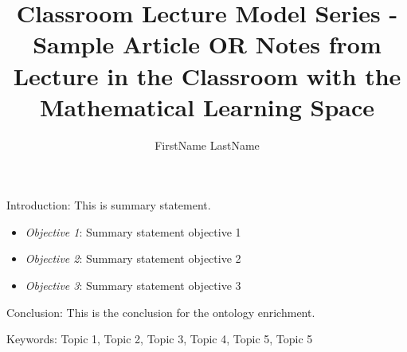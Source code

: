 

\twocolumn
\scriptsize
	\begin{frontmatter}
		\title{Classroom Lecture Model Series -  Sample Article OR Notes from Lecture in the Classroom with the Mathematical Learning Space}
		\author{FirstName LastName }
		\address{Category, Location1 Location2}
	\end{frontmatter}	
Introduction: This is summary statement.
\begin{itemize}
\item \textit{Objective 1}: Summary statement objective 1
\item \textit{Objective 2}: Summary statement objective 2
\item \textit{Objective 3}: Summary statement objective 3
\end{itemize}		
Conclusion:  This is the conclusion for the ontology enrichment.
		
Keywords: Topic 1, Topic 2, Topic 3, Topic 4, Topic 5, Topic 5